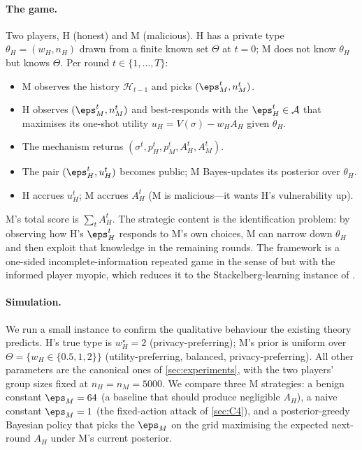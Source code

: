 \paragraph{The game.}
Two players, H (honest) and M (malicious). H has a private type
$\theta_H = (w_H, n_H)$ drawn from a finite known set $\Theta$ at
$t=0$; M does not know $\theta_H$ but knows $\Theta$. Per round $t \in
\{1,\dots,T\}$:
\begin{itemize}
\item M observes the history $\mathcal{H}_{t-1}$ and picks
$(\eps_M^t, n_M^t)$.
\item H observes $(\eps_M^t, n_M^t)$ and best-responds with the
$\eps_H^t \in \mathcal{A}$ that maximises its one-shot utility
$u_H = V(\sigma) - w_H A_H$ given $\theta_H$.
\item The mechanism returns $(\sigma^t, p_H^t, p_M^t, A_H^t, A_M^t)$.
\item The pair $(\eps_H^t, u_H^t)$ becomes public; M Bayes-updates its
posterior over $\theta_H$.
\item H accrues $u_H^t$; M accrues $A_H^t$ (M is malicious---it wants
H's vulnerability up).
\end{itemize}
M's total score is $\sum_t A_H^t$. The strategic content is the
identification problem: by observing how H's $\eps_H^t$ responds to M's
own choices, M can narrow down $\theta_H$ and then exploit that knowledge
in the remaining rounds. The framework is a one-sided
incomplete-information repeated game in the sense of
\citet{aumann1995repeated} but with the informed player myopic, which
reduces it to the Stackelberg-learning instance of
\citet{letchford2009learning}.

\paragraph{Simulation.}
We run a small instance to confirm the qualitative behaviour the existing
theory predicts. H's true type is $w_H^\star = 2$ (privacy-preferring);
M's prior is uniform over $\Theta = \{w_H \in \{0.5, 1, 2\}\}$
(utility-preferring, balanced, privacy-preferring). All other
parameters are the canonical ones of \cref{sec:experiments}, with the
two players' group sizes fixed at $n_H = n_M = 5000$. We compare three
M strategies: a benign constant $\eps_M = 64$ (a baseline that should
produce negligible $A_H$), a naive constant $\eps_M = 1$ (the
fixed-action attack of \cref{sec:C4}), and a posterior-greedy Bayesian
policy that picks the $\eps_M$ on the grid maximising the expected next-
round $A_H$ under M's current posterior.

